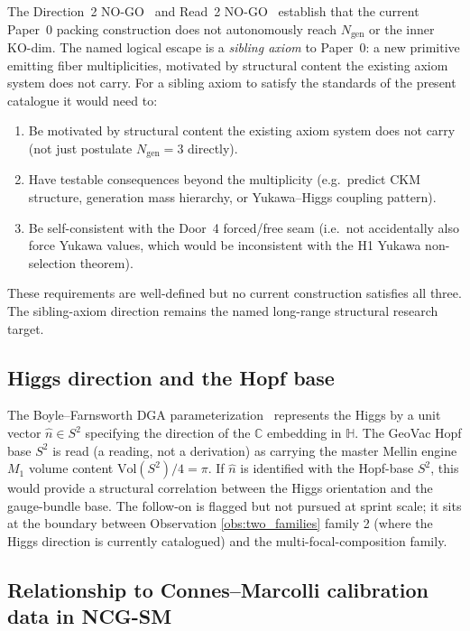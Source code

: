 \documentclass[11pt,a4paper]{article}
\theoremstyle{plain}
\theoremstyle{definition}
\newcommand{\Ngen}{N_{\mathrm{gen}}}
\newcommand{\Vol}{\mathrm{Vol}}
\newcommand{\sphere}[1]{S^{#1}}
\newcommand{\C}{\mathbb{C}}
\newcommand{\HH}{\mathbb{H}}
\begin{document}
The Direction~2 NO-GO~\cite{debug_seam_packing} and Read~2 NO-GO~\cite{debug_read2} establish that the current Paper~0 packing construction does not autonomously reach $\Ngen$ or the inner KO-dim. The named logical escape is a \emph{sibling axiom} to Paper~0:  a new primitive emitting fiber multiplicities, motivated by structural content the existing axiom system does not carry. For a sibling axiom to satisfy the standards of the present catalogue it would need to:
\begin{enumerate}
  \item Be motivated by structural content the existing axiom system does not carry (not just postulate $\Ngen = 3$ directly).
  \item Have testable consequences beyond the multiplicity (e.g.\ predict CKM structure, generation mass hierarchy, or Yukawa--Higgs coupling pattern).
  \item Be self-consistent with the Door~4 forced/free seam (i.e.\ not accidentally also force Yukawa values, which would be inconsistent with the H1 Yukawa non-selection theorem).
\end{enumerate}
These requirements are well-defined but no current construction satisfies all three. The sibling-axiom direction remains the named long-range structural research target.

\subsection{Higgs direction and the Hopf base}
\label{sec:open_higgs_hopf}

The Boyle--Farnsworth DGA parameterization~\cite{boyle_farnsworth2018} represents the Higgs by a unit vector $\hat n \in \sphere{2}$ specifying the direction of the $\C$ embedding in $\HH$. The GeoVac Hopf base $\sphere{2}$ is read (a reading, not a derivation) as carrying the master Mellin engine $M_1$ volume content $\Vol(\sphere{2})/4 = \pi$. If $\hat n$ is identified with the Hopf-base $\sphere{2}$, this would provide a structural correlation between the Higgs orientation and the gauge-bundle base. The follow-on is flagged but not pursued at sprint scale; it sits at the boundary between Observation \ref{obs:two_families} family 2 (where the Higgs direction is currently catalogued) and the multi-focal-composition family.

\subsection{Relationship to Connes--Marcolli calibration data in NCG-SM}
\label{sec:open_ncg_sm}
\end{document}
